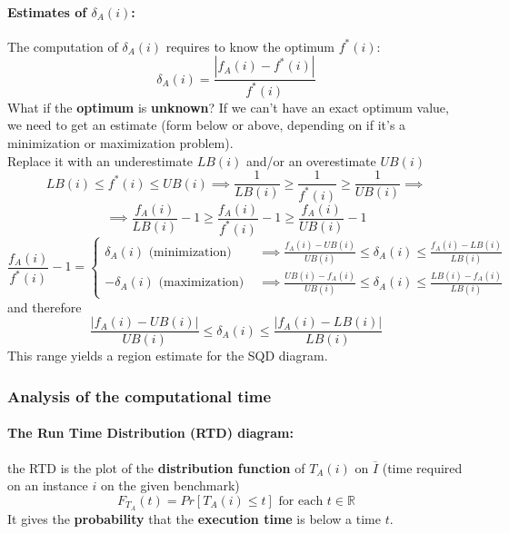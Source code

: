 \documentclass[11pt]{article}
\begin{document}
	\paragraph{Estimates of $\delta_A (i)$:} The computation of $\delta_A (i)$ requires to know the optimum $f^\ast (i)$:
	$$ \delta_A (i) = \frac{|f_A (i) - f^\ast (i)|}{f^\ast (i)}$$
	What if the \textbf{optimum} is \textbf{unknown}? If we can't have an exact optimum value, we need to get an estimate (form below or above, depending on if it's a minimization or maximization problem).\\
	Replace it with an underestimate $LB (i )$ and/or an overestimate $UB (i )$
	$$ LB (i ) \leq f^\ast (i) \leq UB (i ) \implies \frac{1}{LB(i)} \geq \frac{1}{f^\ast (i)} \geq \frac{1}{UB(i)} \implies $$
	$$ \implies \frac{f_A(i)}{LB(i)} - 1 \geq \frac{f_A(i)}{f^\ast (i)} - 1 \geq \frac{f_A(i)}{UB(i)} - 1 $$
	$$ \frac{f_A(i)}{f^\ast (i)} - 1 = \begin{cases}
		\delta_A (i) \text{ (minimization) } & \implies \frac{f_A(i) - UB(i)}{UB(i)} \leq \delta_A (i) \leq \frac{f_A(i) - LB(i)}{LB(i)} \\
		- \delta_A (i) \text{ (maximization) } & \implies \frac{UB(i) - f_A(i)}{UB(i)} \leq \delta_A (i) \leq \frac{LB(i) - f_A(i)}{LB(i)}
	\end{cases}$$
	and therefore
	$$ \frac{|f_A(i) - UB(i)|}{UB(i)} \leq \delta_A (i) \leq \frac{|f_A(i) - LB(i)|}{LB(i)} $$
	This range yields a region estimate for the SQD diagram.\\
	
	\newpage 
	
	\subsubsection{Analysis of the computational time}
	\paragraph{The Run Time Distribution (RTD) diagram:} the RTD is the plot of the \textbf{distribution function} of $T_A (i )$ on $\overline{I}$ (time required on an instance $i$ on the given benchmark)
	$$ F_{T_A} (t) = Pr \left[T_A (i) \leq t \right] \text{ for each } t \in \mathbb{R} $$
	It gives the \textbf{probability} that the \textbf{execution time} is below a time $t$. \\
	
\end{document}
